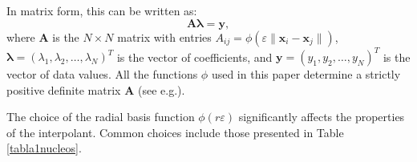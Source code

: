 \documentclass[preprint]{elsarticle}       %
\begin{document}
In matrix form, this can be written as:
\begin{equation}\label{sistema}
\mathbf{A} \boldsymbol{\lambda} = \mathbf{y},
\end{equation}
where $\mathbf{A}$ is the $N \times N$ matrix with entries $A_{ij} = \phi(\varepsilon\|\mathbf{x}_i - \mathbf{x}_j\|)$, $\boldsymbol{\lambda} = (\lambda_1, \lambda_2, \ldots, \lambda_N)^T$ is the vector of coefficients, and $\mathbf{y} = (y_1, y_2, \ldots, y_N)^T$ is the vector of data values. All the functions $\phi$ used in this paper determine a strictly positive definite matrix $\mathbf{A}$ (see e.g.\cite{Fasshauer2007,Wendland}).



The choice of the radial basis function $\phi(r\varepsilon)$ significantly affects the properties of the interpolant. Common choices include those presented in Table \ref{tabla1nucleos}.
\end{document}
